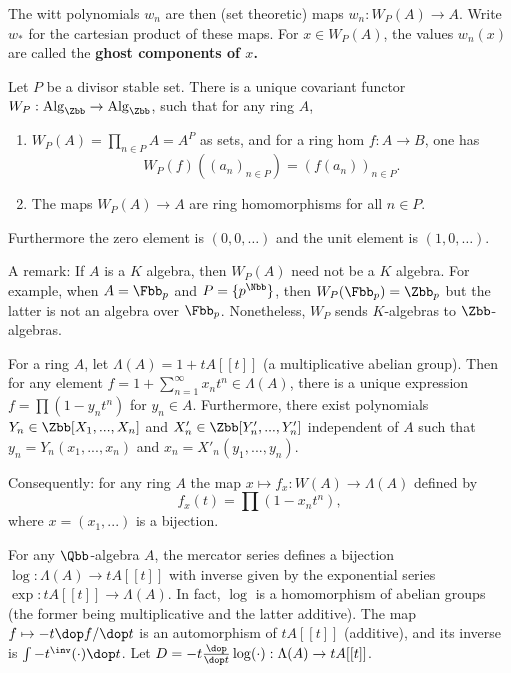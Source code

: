 \documentclass{amsart}
\begin{document}
The witt polynomials $w_n$ are then (set theoretic) maps $w_n : W_P(A) \to A$. Write $w_*$ for the cartesian product of these maps.  For $x\in W_P(A)$, the values $w_n(x)$ are called the \bf{ghost components of $x$}.

\begin{thm}
  Let $P$ be a divisor stable set. There is a unique covariant functor $W_P : \rm{Alg}_\Zbb \to \rm{Alg}_\Zbb$, such
  that for any ring $A$,
  \begin{enumerate}
    \item $W_P(A) = \prod_{n \in P} A = A^P$ as sets, and for a ring hom $f : A \to B$, one has
          \begin{equation*}
            W_P(f) ((a_n)_{n\in P})  = (f(a_n))_{n \in P}.
          \end{equation*}
    \item The maps $W_P(A) \to A$ are ring homomorphisms for all $n \in P$.
  \end{enumerate}
  Furthermore the zero element is  $(0,0,\ldots)$ and the unit element is $(1,0,\ldots)$.
\end{thm}

A remark: If $A$ is a $K$ algebra, then $W_P(A)$ need not be a $K$ algebra. For example, when $A = \Fbb_p$ and $P=\{
  p^\Nbb\}$, then $W_P(\Fbb_p)= \Zbb_p$ but the latter is not an algebra over $\Fbb_p$. Nonetheless, $W_P$ sends
$K$-algebras to $\Zbb$-algebras.

For a ring $A$, let $\Lambda (A) = 1 + t A[[t]]$ (a multiplicative abelian group). Then for any element $f= 1 +
  \sum_{n=1}^\infty x_n t^n  \in \Lambda(A)$, there is a unique expression $f = \prod (1 - y_n t^n)$ for $y_n \in A$.
Furthermore, there exist polynomials $Y_n \in \Zbb[X_1,...,X_n]$ and $X'_n \in \Zbb[Y'_n,...,Y'_n]$ independent of
$A$ such that $y_n = Y_n ( x_1 , ..., x_n )$ and $x_n = X'_n(y_1, ... , y_n)$.

Consequently: for any ring $A$ the map $x \mapsto f_x : W(A) \to \Lambda(A)$ defined by
\begin{equation}
  f_x (t) = \prod (1-x_n t^n),
\end{equation}
where $x = (x_1, ...)$ is a bijection.


For any $\Qbb$-algebra $A$, the mercator series defines a bijection $\log : \Lambda(A) \to t A[[t]]$ with inverse given
by the exponential series $\exp : t A [[t]] \to \Lambda(A)$. In fact, $\log$ is a homomorphism of abelian groups (the
former being multiplicative and the latter additive). The map $f \mapsto -t \dop f / \dop t $ is an automorphism of
$tA[[t]]$ (additive), and its inverse is $\int - t^\inv (\cdot ) \dop t$.  Let $D = -t \frac{\dop }{\dop t} \log
  (\cdot): \Lambda(A) \to t A[[t]]$.


%
%
\end{document}
